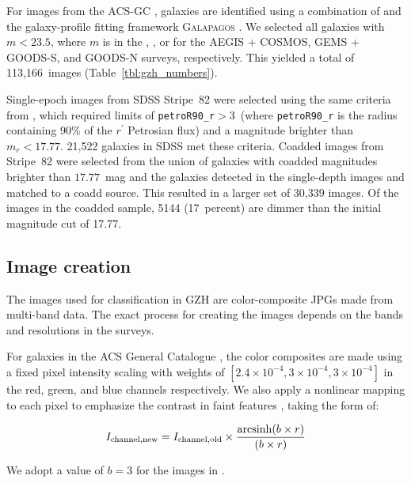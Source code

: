 \documentclass[usenatbib]{mn2e}
\begin{document}
For images from the ACS-GC \citet{gri12}, galaxies are identified using a combination of \sextractor{} \citep{ber96} and the galaxy-profile fitting framework \textsc{Galapagos} \citep{hau07}. We selected all galaxies with $m < 23.5$, where $m$ is in the \Iband, \zband, or \iband{} for the AEGIS + COSMOS, GEMS + GOODS-S, and GOODS-N surveys, respectively. This yielded a total of 113,166~images (Table~\ref{tbl:gzh_numbers}).

Single-epoch images from SDSS Stripe~82 were selected using the same criteria from \citet{wil13}, which required limits of \texttt{petroR90\_r}$ > 3$\arcsec~(where \texttt{petroR90\_r} is the radius containing 90\% of the $r^\prime$ Petrosian flux) and a magnitude brighter than $m_r < 17.77$. 21,522 galaxies in SDSS met these criteria. Coadded images from Stripe~82 were selected from the union of galaxies with coadded magnitudes brighter than $17.77$~mag and the galaxies detected in the single-depth images and matched to a coadd source. This resulted in a larger set of 30,339 images. Of the images in the coadded sample, 5144 (17~percent) are dimmer than the initial magnitude cut of 17.77. 

\subsection{Image creation}

The images used for classification in GZH are color-composite JPGs made from multi-band data. The exact process for creating the images depends on the bands and resolutions in the surveys. 

For galaxies in the ACS General Catalogue \citep[AEGIS, COSMOS, GEMS, 2-epoch GOODS;][]{gri12}, the color composites are made using a fixed pixel intensity scaling with weights of $[2.4\times10^{-4},3\times10^{-4},3\times10^{-4}]$ in the red, green, and blue channels respectively. We also apply a nonlinear mapping to each pixel to emphasize the contrast in faint features \citep{lup04}, taking the form of:

\begin{equation}
I_\mathrm{channel,new} = I_\mathrm{channel,old} \times \frac{\operatorname{arcsinh}(b\times r)}{(b\times r)}
\label{eqn:nonlinear}
\end{equation}

\noindent We adopt a value of $b=3$ for the \hst{} images in \citet{gri12}. 
\end{document}
